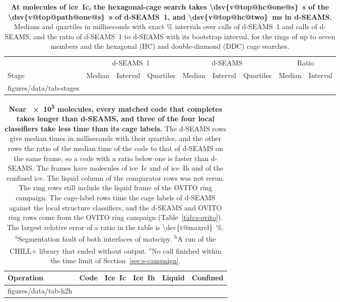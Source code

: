 \documentclass[preprint,12pt]{elsarticle}
\makeatletter
\newcommand{\tabbody}[1]{\@@input #1 }
\makeatother
\begin{document}
\begin{table}
\bigskip
\caption{\textbf{At  molecules of ice~Ic, the hexagonal-cage search takes \qty{\dsv{v@top@hc@one@s}}{\second} of the \qty{\dsv{v@top@path@one@s}}{\second} of d-SEAMS~1, and \qty{\dsv{v@top@hc@two}}{\milli\second} in d-SEAMS.}
Medians and quartiles in milliseconds with exact \% intervals over  calls of d-SEAMS~1 and  calls of d-SEAMS, and the ratio of d-SEAMS~1 to d-SEAMS with its bootstrap interval, for the rings of up to seven members and the hexagonal (HC) and double-diamond (DDC) cage searches.}
\label{tab:s-stages}
\setlength{\tabcolsep}{4pt}
\begin{tabular}{@{}lrccrccrc@{}}
\toprule
 & \multicolumn{3}{c}{d-SEAMS~1} & \multicolumn{3}{c}{d-SEAMS} & \multicolumn{2}{c}{Ratio} \\
\cmidrule(lr){2-4}\cmidrule(lr){5-7}\cmidrule(l){8-9}
Stage & Median & Interval & Quartiles & Median & Interval & Quartiles & Median & Interval \\
\midrule
\tabbody{figures/data/tab-stages}
\bottomrule
\end{tabular}
\end{table}

\begin{table}[tbp]
\centering
\caption{\textbf{Near \num{e5} molecules, every matched code that completes takes longer than d-SEAMS, and three of the four local classifiers take less time than its cage labels.}
The d-SEAMS rows give median times in milliseconds with their quartiles, and the other rows the ratio of the median time of the code to that of d-SEAMS on the same frame, so a code with a ratio below one is faster than d-SEAMS.
The frames have  molecules of ice~Ic and of ice~Ih and  of the confined ice.
The liquid column of the comparator rows was not rerun.
The ring rows still include the liquid frame of the OVITO ring campaign.
The cage-label rows time the cage labels of d-SEAMS against the local structure classifiers, and the d-SEAMS and OVITO ring rows come from the OVITO ring campaign (Table~\ref{tab:s-ovito}).
The largest relative error of a ratio in the table is \qty{\dsv{t@maxrel}}{\percent}.
\textsuperscript{a}Segmentation fault of both interfaces of matscipy.
\textsuperscript{b}A run of the CHILL+ library that ended without output.
\textsuperscript{c}No call finished within the time limit of Section~\ref{sec:s-campaign}.}
\label{tab:s-h2h}
\small
\setlength{\tabcolsep}{4pt}
\begin{tabular}{@{}llrrrr@{}}
\toprule
Operation & Code & Ice~Ic & Ice~Ih & Liquid & Confined \\
\midrule
\tabbody{figures/data/tab-h2h}
\bottomrule
\end{tabular}
\end{table}
\end{document}
